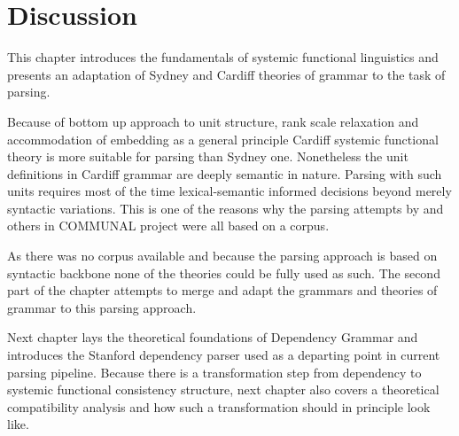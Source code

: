 \section{Discussion}

    This chapter introduces the fundamentals of systemic functional linguistics and presents an adaptation of Sydney and Cardiff theories of grammar to the task of parsing.
    
    Because of bottom up approach to unit structure, rank scale relaxation and accommodation of embedding as a general principle Cardiff systemic functional theory is more suitable for parsing than Sydney one. Nonetheless the unit definitions in Cardiff grammar are deeply semantic in nature. Parsing with such units requires most of the time lexical-semantic informed decisions beyond merely syntactic variations. This is one of the reasons why the parsing attempts by \citet{ODonoghue1991a} and others in COMMUNAL project were all based on a corpus.
    
    As there was no corpus available and because the parsing approach is based on syntactic backbone none of the theories could be fully used as such. The second part of the chapter attempts to merge and adapt the grammars and theories of grammar to this parsing approach.
    
    Next chapter lays the theoretical foundations of Dependency Grammar and introduces the Stanford dependency parser used as a departing point in current parsing pipeline. Because there is a transformation step from dependency to systemic functional consistency structure, next chapter also covers a theoretical compatibility analysis and how such a transformation should in principle look like. 


